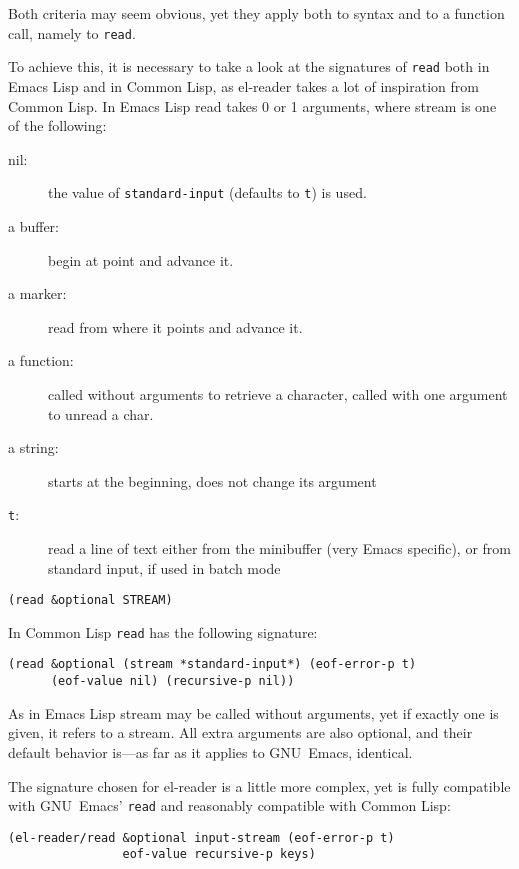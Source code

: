 \documentclass[a4paper,10pt,twoside]{report}
\newcommand{\el}{Emacs Lisp}
\newcommand{\cl}{Common Lisp}
\newcommand{\elr}{el-reader}
\newcommand{\sym}[1]{\texttt{#1}}
\newcommand{\fun}[1]{\texttt{#1}}
\newcommand{\emacs}{GNU~Emacs}
\newcommand{\Read}{\fun{read}}
\begin{document}
Both criteria may seem obvious, yet they apply both to syntax and to a function
call, namely to \Read{}.

To achieve this, it is necessary to take a look at the signatures of \Read{}
both in \el{} and in \cl{}, as \elr{} takes a lot of inspiration from \cl{}.  In
\el{} read takes 0 or 1 arguments, where stream is one of the following:
\begin{description}
\item[nil:] the value of \sym{standard-input} (defaults to \sym{t}) is used.
\item[a buffer:] begin at point and advance it.
\item[a marker:] read from where it points and advance it.
\item[a function:] called without arguments to retrieve a character, called with
  one argument to unread a char.
\item[a string:] starts at the beginning, does not change its argument
\item[\sym{t}:] read a line of text either from the minibuffer (very Emacs
  specific), or from standard input, if used in batch mode
\end{description}

\begin{lstlisting}[style=lispinline]
(read &optional STREAM)
\end{lstlisting}

In \cl{} \Read{} has the following signature:

\begin{lstlisting}[style=lispinline]
(read &optional (stream *standard-input*) (eof-error-p t)
      (eof-value nil) (recursive-p nil))
\end{lstlisting}

As in \el{} stream may be called without arguments, yet if exactly one is given,
it refers to a stream.  All extra arguments are also optional, and their default
behavior is---as far as it applies to \emacs{}, identical.

The signature chosen for \elr{} is a little more complex, yet is fully
compatible with \emacs{}’ \Read{} and reasonably compatible with \cl{}:

\begin{lstlisting}[style=lispinline]
(el-reader/read &optional input-stream (eof-error-p t)
                eof-value recursive-p keys)
\end{lstlisting}
\end{document}
